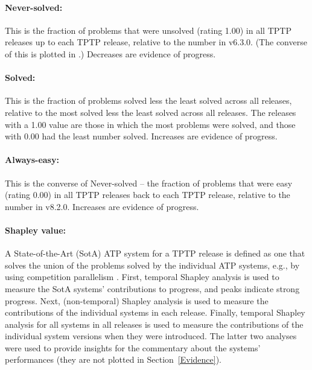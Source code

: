 \documentclass[runningheads]{llncs}
\begin{document}
\paragraph{Never-solved:}
This is the fraction of problems that were unsolved (rating 1.00) in all TPTP releases 
up to each TPTP release, relative to the number in v6.3.0.
(The converse of this is plotted in \cite{SSP21}.)
Decreases are evidence of progress.

\vspace*{-0.5em}
\paragraph{Solved:}
This is the fraction of problems solved less the least solved across all releases, 
relative to the most solved less the least solved across all releases.
The releases with a 1.00 value are those in which the most problems were solved, and those with
0.00 had the least number solved.
Increases are evidence of progress.

\vspace*{-0.5em}
\paragraph{Always-easy:}
This is the converse of Never-solved -- the fraction of problems that were easy (rating 0.00) in 
all TPTP releases back to each TPTP release, relative to the number in v8.2.0.
Increases are evidence of progress.

\vspace*{-0.5em}
\paragraph{Shapley value:}
A State-of-the-Art (SotA) ATP system for a TPTP release is defined as one that solves the union 
of the problems solved by the individual ATP systems, e.g., by using competition parallelism
\cite{SS94-PPAI}.
First, temporal Shapley analysis \cite{KF+19} is used to measure the SotA systems' contributions to 
progress, and peaks indicate strong progress.
Next, (non-temporal) Shapley analysis \cite{FK+16} is used to measure the contributions of the
individual systems in each release.
Finally, temporal Shapley analysis for all systems in all releases is used to measure the
contributions of the individual system versions when they were introduced.
The latter two analyses were used to provide insights for the commentary about the systems' 
performances (they are not plotted in Section~\ref{Evidence}).
\end{document}
